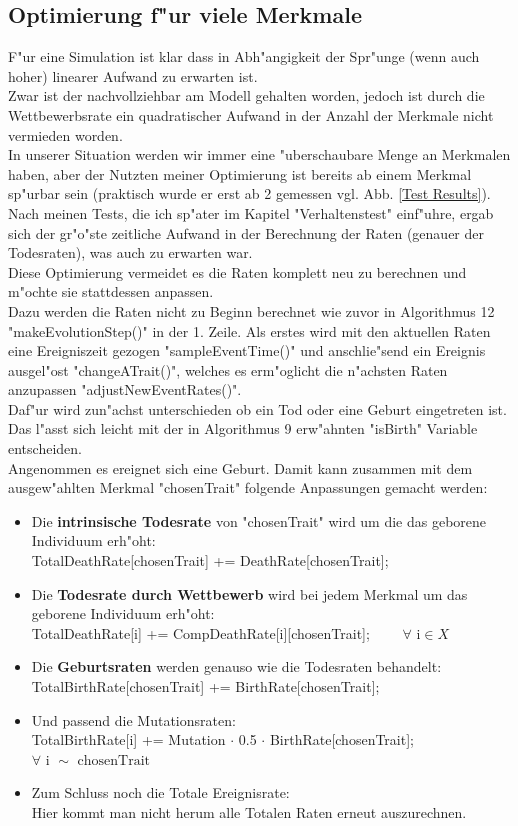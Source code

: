 \documentclass[11pt, a4paper, german]{article}
\theoremstyle{plain}
\begin{document}
	\subsection{Optimierung f"ur viele Merkmale}
	F"ur eine Simulation ist klar dass in Abh"angigkeit der Spr"unge (wenn auch hoher) linearer Aufwand zu erwarten ist.\\
	Zwar ist der nachvollziehbar am Modell gehalten worden, jedoch ist durch die Wettbewerbsrate ein quadratischer Aufwand in der Anzahl der Merkmale nicht vermieden worden.\\
	In unserer Situation werden wir immer eine "uberschaubare Menge an Merkmalen haben, aber der Nutzten meiner Optimierung ist bereits ab einem Merkmal sp"urbar sein (praktisch wurde er erst ab 2 gemessen vgl. Abb. \ref{Test Results}).\\
	Nach meinen Tests, die ich sp"ater im Kapitel "{}Verhaltenstest"{} einf"uhre, ergab sich der gr"o"ste zeitliche Aufwand in der Berechnung der Raten (genauer der Todesraten), was auch zu erwarten war.\\
	Diese Optimierung vermeidet es die Raten komplett neu zu berechnen und m"ochte sie stattdessen anpassen. \\
	Dazu werden die Raten nicht zu Beginn berechnet wie zuvor in Algorithmus 12 "{}makeEvolutionStep()"{} in der 1. Zeile. Als erstes wird mit den aktuellen Raten eine Ereigniszeit gezogen "{}sampleEventTime()"{} und anschlie"send ein Ereignis ausgel"ost "{}changeATrait()"{}, welches es erm"oglicht die n"achsten Raten anzupassen "{}adjustNewEventRates()"{}.\\
	Daf"ur wird zun"achst unterschieden ob ein Tod oder eine Geburt eingetreten ist. Das l"asst sich leicht mit der in Algorithmus 9 erw"ahnten "{}isBirth"{} Variable entscheiden.\\
	Angenommen es ereignet sich eine Geburt. Damit kann zusammen mit dem ausgew"ahlten Merkmal "{}chosenTrait"{} folgende Anpassungen gemacht werden:
	\begin{itemize}
		\item Die \textbf{intrinsische Todesrate} von "{}chosenTrait"{} wird um die das geborene Individuum erh"oht:\\ 
		TotalDeathRate[chosenTrait] += DeathRate[chosenTrait];
		\item Die \textbf{Todesrate durch Wettbewerb} wird bei jedem Merkmal um das geborene Individuum erh"oht:\\
		TotalDeathRate[i] += CompDeathRate[i][chosenTrait]; $ \qquad \forall \text{ i} \in X $
		\item Die \textbf{Geburtsraten} werden genauso wie die Todesraten behandelt:\\
		TotalBirthRate[chosenTrait] += BirthRate[chosenTrait];
		\item Und passend die Mutationsraten:\\
		TotalBirthRate[i] += Mutation $ \cdot $ 0.5 $ \cdot $ BirthRate[chosenTrait]; \\
		$\forall \text{ i } \sim \text{ chosenTrait} $
		\item Zum Schluss noch die Totale Ereignisrate:\\
		Hier kommt man nicht herum alle Totalen Raten erneut auszurechnen.
	\end{itemize}
\end{document}
